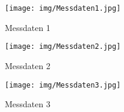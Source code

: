 \begin{figure}
    \texttt{[image: img/Messdaten1.jpg]}
    \caption{Messdaten 1}
\end{figure}
\begin{figure}
    \texttt{[image: img/Messdaten2.jpg]}
    \caption{Messdaten 2}
\end{figure}
\begin{figure}
    \texttt{[image: img/Messdaten3.jpg]}
    \caption{Messdaten 3}
\end{figure}